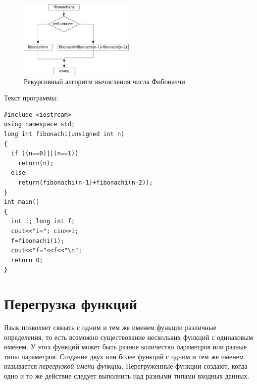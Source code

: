 \begin{figure}[htb]
\begin{center}
\includegraphics[width=0.5\textwidth]{img/ris_4_12}
\caption{Рекурсивный алгоритм вычисления числа Фибоначчи}
\label{ch04:refDrawing11}
\end{center}
\end{figure}

Текст программы:
\begin{lstlisting}
#include <iostream> 
using namespace std;
long int fibonachi(unsigned int n) 
{
  if ((n==0)||(n==1)) 
    return(n); 
  else 
    return(fibonachi(n-1)+fibonachi(n-2)); 
}
int main()
{
  int i; long int f;
  cout<<"i="; cin>>i;
  f=fibonachi(i);
  cout<<"f="<<f<<"\n";
  return 0;
}
\end{lstlisting}

\section[Перегрузка функций]{Перегрузка функций}
Язык  позволяет связать с одним и тем же именем функции различные определения, то есть возможно существование
нескольких функций с одинаковым именем. У этих функций может быть разное количество параметров или разные типы
параметров. Создание двух или более функций с одним и тем же именем называется \emph{перегрузкой имени функции}. Перегруженные функции создают, когда одно и то же действие следует
выполнить над разными типами входных данных.

